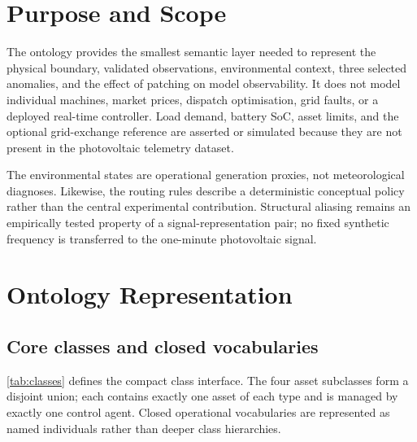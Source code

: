 \section{Purpose and Scope}

The ontology provides the smallest semantic layer needed to represent the physical boundary, validated observations, environmental context, three selected anomalies, and the effect of patching on model observability. It does not model individual machines, market prices, dispatch optimisation, grid faults, or a deployed real-time controller. Load demand, battery SoC, asset limits, and the optional grid-exchange reference are asserted or simulated because they are not present in the photovoltaic telemetry dataset.

The environmental states are operational generation proxies, not meteorological diagnoses. Likewise, the routing rules describe a deterministic conceptual policy rather than the central experimental contribution. Structural aliasing remains an empirically tested property of a signal-representation pair; no fixed synthetic frequency is transferred to the one-minute photovoltaic signal.

\section{Ontology Representation}

\subsection{Core classes and closed vocabularies}

\autoref{tab:classes} defines the compact class interface. The four asset subclasses form a disjoint union; each  contains exactly one asset of each type and is managed by exactly one control agent. Closed operational vocabularies are represented as named individuals rather than deeper class hierarchies.



